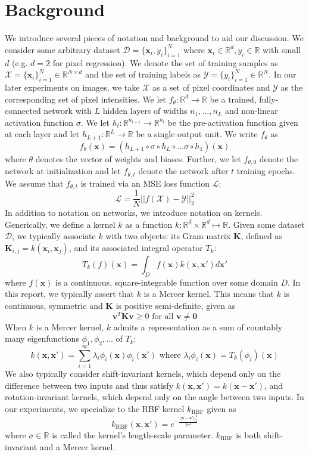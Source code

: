 \documentclass[11pt]{article}
\newcommand{\R}{\mathbb{R}}
\newcommand{\X}{\mathcal{X}}
\newcommand{\Y}{\mathcal{Y}}
\begin{document}
\section{Background}
We introduce several pieces of notation and background to aid our discussion. We consider some arbitrary dataset $\mathcal{D} = \{\mathbf{x}_i, y_i\}_{i = 1}^N$ where $\mathbf{x}_i \in \R^{d}, y_i \in \R$ with small $d$ (e.g. $d = 2$ for pixel regression). We denote the set of training samples as $\X = \{\mathbf{x}_{i}\}_{i = 1}^N \in \R^{N \times d}$ and the set of training labels as $\Y = \{y_i\}_{i = 1}^N \in \R^N$. In our later experiments on images, we take $\X$ as a set of pixel coordinates and $\Y$ as the corresponding set of pixel intensities. We let $f_\theta : \R^{d} \rightarrow \R$ be a trained, fully-connected network with $L$ hidden layers of widths $n_1, \dots, n_L$ and non-linear activation function $\sigma$. We let $h_l : \R^{n_{l - 1}} \rightarrow \R^{n_l}$ be the pre-activation function given at each layer and let $h_{L + 1} : \R^{L} \rightarrow \R$ be a single output unit. We write $f_\theta$ as
$$f_\theta(\mathbf{x}) = (h_{L + 1} \circ \sigma \circ h_{L} \circ \dots \sigma \circ h_{1})(\mathbf{x})$$
where $\theta$ denotes the vector of weights and biases. Further, we let $f_{\theta, 0}$ denote the network at initialization and let $f_{\theta, t}$ denote the network after $t$ training epochs. We assume that $f_{\theta, t}$ is trained via an MSE loss function $\mathcal{L}$:
$$\mathcal{L} = \frac{1}{N}||f(\X) - \Y||_2^2$$
In addition to notation on networks, we introduce notation on kernels. Generically, we define a kernel $k$ as a function $k : \R^d \times \R^d \mapsto \R$. Given some dataset $\mathcal{D}$, we typically associate $k$ with two objects: its Gram matrix $\mathbf{K}$, defined as $\mathbf{K}_{i,j} = k(\mathbf{x}_i, \mathbf{x}_j)$, and its associated integral operator $T_k$:
$$T_k(f)(\mathbf{x}) = \int_D f(\mathbf{x})k(\mathbf{x}, \mathbf{x}')d\mathbf{x}'$$
where $f(\mathbf{x})$ is a continuous, square-integrable function over some domain $D$. In this report, we typically assert that $k$ is a Mercer kernel. This means that $k$ is continuous, symmetric and $\mathbf{K}$ is positive semi-definite, given as 
$$\mathbf{v}^T\mathbf{K}\mathbf{v} \ge 0 \text{  for all  } \mathbf{v} \neq \mathbf{0}$$
When $k$ is a Mercer kernel, $k$ admits a representation as a sum of countably many eigenfunctions $\phi_1, \phi_2, \dots$ of $T_k$:
$$k(\mathbf{x}, \mathbf{x}') = \sum_{i = 1}^\infty\lambda_i\phi_i(\mathbf{x})\phi_i(\mathbf{x}') \text{  where  } \lambda_i\phi_i(\mathbf{x}) = T_k(\phi_i)(\mathbf{x})$$
We also typically consider shift-invariant kernels, which depend only on the difference between two inputs and thus satisfy $k(\mathbf{x}, \mathbf{x}') = k(\mathbf{x} - \mathbf{x}')$, and rotation-invariant kernels, which depend only on the angle between two inputs. In our experiments, we specialize to the RBF kernel $k_\text{RBF}$ given as
$$k_\text{RBF}(\mathbf{x}, \mathbf{x}') = e^{-\frac{||\mathbf{x} - \mathbf{x}'||_2^2}{2\sigma^2}}$$
where $\sigma \in \R$ is called the kernel's length-scale parameter. $k_\text{RBF}$ is both shift-invariant and a Mercer kernel.
\end{document}
